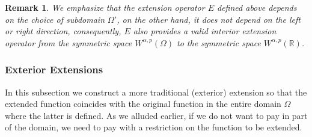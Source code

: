 \documentclass[leqno,final]{siamltex}
\numberwithin{equation}{section}
\newtheorem{remark}{Remark}[section]
\renewcommand{\(}{\bigl(}
\renewcommand{\)}{\bigr)}
\newcommand{\R}{\mathbb{R}}
\begin{document}
    
  \begin{remark}
  	We emphasize that  the extension operator $E$ defined above depends on the choice of subdomain $\Omega'$, 
  	on the other hand, it does not depend on the left or right direction,  consequently,  $E$ also provides a valid 
  	{\em interior extension operator} from the symmetric space $W^{\alpha ,p}(\Omega)$ to the symmetric space $ {W}^{\alpha,p}(\R)$. 
  \end{remark}
    
    \subsubsection{\bf Exterior Extensions}\label{sec-4.2.3}
     In this subsection we construct a more traditional (exterior) extension so that the 
     extended function 
     coincides with the original function in the entire domain $\Omega$ where the latter is defined. As we alluded  earlier, if we do not want to pay in part of the domain, we need to pay with a restriction on 
     the function to be extended.
     
\end{document}
